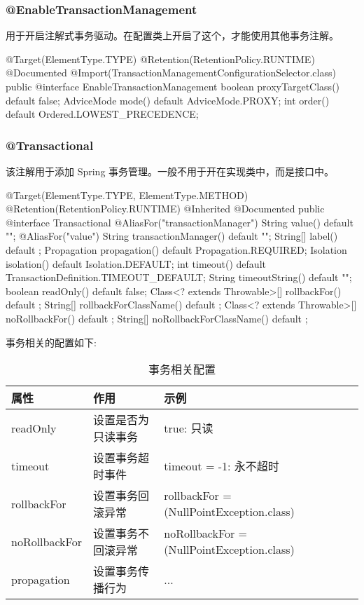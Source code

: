 \subsubsection{@EnableTransactionManagement}

用于开启注解式事务驱动。在配置类上开启了这个，才能使用其他事务注解。

\begin{Java}
@Target(ElementType.TYPE)
@Retention(RetentionPolicy.RUNTIME)
@Documented
@Import(TransactionManagementConfigurationSelector.class)
public @interface EnableTransactionManagement {
    boolean proxyTargetClass() default false;
    AdviceMode mode() default AdviceMode.PROXY;
    int order() default Ordered.LOWEST_PRECEDENCE;
}
\end{Java}

\subsubsection{@Transactional}

该注解用于添加 Spring 事务管理。一般不用于开在实现类中，而是接口中。

\begin{Java}
@Target({ElementType.TYPE, ElementType.METHOD})
@Retention(RetentionPolicy.RUNTIME)
@Inherited
@Documented
public @interface Transactional {
    @AliasFor("transactionManager")
    String value() default "";
    @AliasFor("value")
    String transactionManager() default "";
    String[] label() default {};
    Propagation propagation() default Propagation.REQUIRED;
    Isolation isolation() default Isolation.DEFAULT;
    int timeout() default TransactionDefinition.TIMEOUT_DEFAULT;
    String timeoutString() default "";
    boolean readOnly() default false;
    Class<? extends Throwable>[] rollbackFor() default {};
    String[] rollbackForClassName() default {};
    Class<? extends Throwable>[] noRollbackFor() default {};
    String[] noRollbackForClassName() default {};
}
\end{Java}

事务相关的配置如下:

\begin{table}[H]
    \centering
    \caption{事务相关配置}
    \label{table:事务相关配置}
    \setlength{\tabcolsep}{4mm}
    \begin{tabular}{l|lll}
        \toprule
        \textbf{属性} & \textbf{作用} & \textbf{示例} \\
        \midrule
        readOnly & 设置是否为只读事务 & true: 只读 \\
        timeout & 设置事务超时事件 & timeout = -1: 永不超时 \\
        rollbackFor & 设置事务回滚异常 & rollbackFor = (NullPointException.class) \\
        noRollbackFor & 设置事务不回滚异常 & noRollbackFor = (NullPointException.class) \\
        propagation & 设置事务传播行为 & ... \\
        \bottomrule
    \end{tabular}
\end{table}

